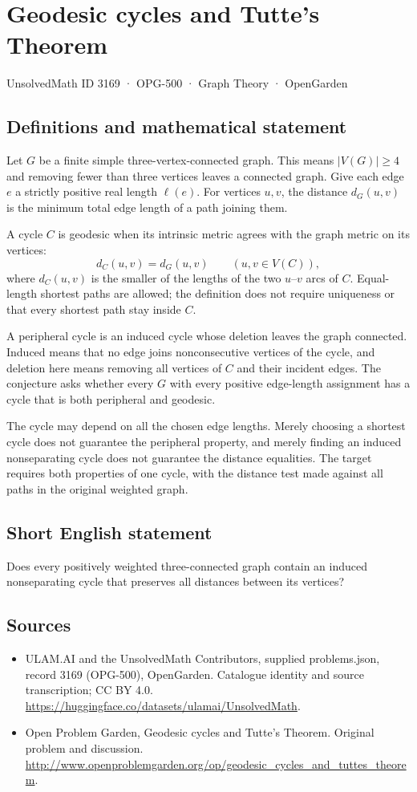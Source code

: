\documentclass[11pt,a4paper]{article}
\begin{document}
\section*{Geodesic cycles and Tutte's Theorem}\label{3169}
{\small UnsolvedMath ID 3169 · OPG-500 · Graph Theory · OpenGarden}
\subsection{Definitions and mathematical statement}
Let $G$ be a finite simple three-vertex-connected graph. This means $|V(G)|\ge4$ and removing fewer than three vertices leaves a connected graph. Give each edge $e$ a strictly positive real length $\ell(e)$. For vertices $u,v$, the distance $d_G(u,v)$ is the minimum total edge length of a path joining them.

A cycle $C$ is geodesic when its intrinsic metric agrees with the graph metric on its vertices:
\[
       d_C(u,v)=d_G(u,v)\qquad(u,v\in V(C)),
\]
where $d_C(u,v)$ is the smaller of the lengths of the two $u$--$v$ arcs of $C$. Equal-length shortest paths are allowed; the definition does not require uniqueness or that every shortest path stay inside $C$.

A peripheral cycle is an induced cycle whose deletion leaves the graph connected. Induced means that no edge joins nonconsecutive vertices of the cycle, and deletion here means removing all vertices of $C$ and their incident edges. The conjecture asks whether every $G$ with every positive edge-length assignment has a cycle that is both peripheral and geodesic.

The cycle may depend on all the chosen edge lengths. Merely choosing a shortest cycle does not guarantee the peripheral property, and merely finding an induced nonseparating cycle does not guarantee the distance equalities. The target requires both properties of one cycle, with the distance test made against all paths in the original weighted graph.
\subsection{Short English statement}
Does every positively weighted three-connected graph contain an induced nonseparating cycle that preserves all distances between its vertices?
\subsection{Sources}
\begin{itemize}
\item[S1] ULAM.AI and the UnsolvedMath Contributors, supplied problems.json, record 3169 (OPG-500), OpenGarden. Catalogue identity and source transcription; CC BY 4.0.
\url{https://huggingface.co/datasets/ulamai/UnsolvedMath}.
\item[S2] Open Problem Garden, Geodesic cycles and Tutte's Theorem. Original problem and discussion.
\url{http://www.openproblemgarden.org/op/geodesic_cycles_and_tuttes_theorem}.
\end{itemize}
\end{document}
